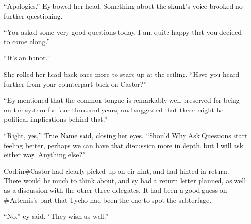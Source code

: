``Apologies.'' Ey bowed her head. Something about the skunk's voice brooked no further questioning.

``You asked some very good questions today. I am quite happy that you decided to come along.''

``It's an honor.''

She rolled her head back once more to stare up at the ceiling. ``Have you heard further from your counterpart back on Castor?''

``Ey mentioned that the common tongue is remarkably well-preserved for being on the system for four thousand years, and suggested that there might be political implications behind that.''

``Right, yes,'' True Name said, closing her eyes. ``Should Why Ask Questions start feeling better, perhaps we can have that discussion more in depth, but I will ask either way. Anything else?''

Codrin\#Castor had clearly picked up on eir hint, and had hinted in return. There would be much to think about, and ey had a return letter planned, as well as a discussion with the other three delegates. It had been a good guess on \#Artemis's part that Tycho had been the one to spot the subterfuge.

``No,'' ey said. ``They wish us well.''
